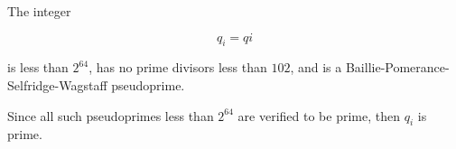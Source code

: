 \pagestyle{empty}
\phantom{a}
\vspace{2em}

\begin{center}
{\Huge {}}
\end{center}
\vspace{2em}

\noindent The integer

{\Huge\vspace{-1.8em}
$$
q_{ {{ i }} } = {{ qi }}
$$
}

\noindent is less than $2^{64}$, has no prime divisors less than $102$, and is a Baillie-Pomerance-Selfridge-Wagstaff pseudoprime.

\vspace{2em}
\noindent Since all such pseudoprimes less than $2^{64}$ are verified to be prime, then $q_{ {{ i }} }$ is prime.